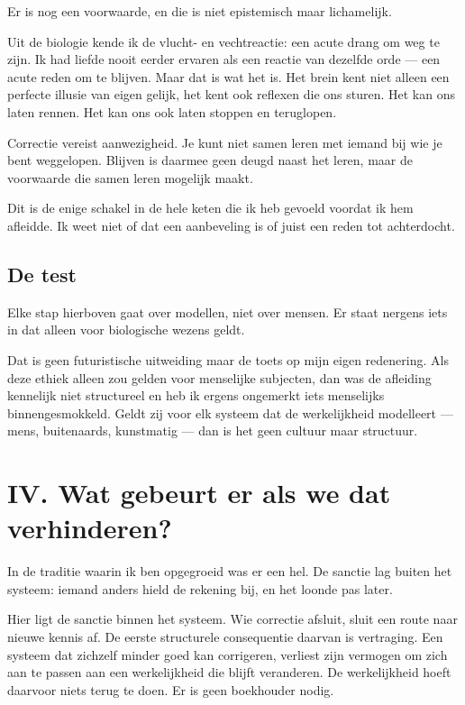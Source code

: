 \documentclass[11pt,a4paper]{article}
\begin{document}
Er is nog een voorwaarde, en die is niet epistemisch maar lichamelijk.

Uit de biologie kende ik de vlucht- en vechtreactie: een acute drang om weg te zijn. Ik had liefde nooit eerder ervaren als een reactie van dezelfde orde --- een acute reden om te blijven. Maar dat is wat het is. Het brein kent niet alleen een perfecte illusie van eigen gelijk, het kent ook reflexen die ons sturen. Het kan ons laten rennen. Het kan ons ook laten stoppen en teruglopen.

Correctie vereist aanwezigheid. Je kunt niet samen leren met iemand bij wie je bent weggelopen. Blijven is daarmee geen deugd naast het leren, maar de voorwaarde die samen leren mogelijk maakt.

Dit is de enige schakel in de hele keten die ik heb gevoeld voordat ik hem afleidde. Ik weet niet of dat een aanbeveling is of juist een reden tot achterdocht.

\subsection*{De test}

Elke stap hierboven gaat over modellen, niet over mensen. Er staat nergens iets in dat alleen voor biologische wezens geldt.

Dat is geen futuristische uitweiding maar de toets op mijn eigen redenering. Als deze ethiek alleen zou gelden voor menselijke subjecten, dan was de afleiding kennelijk niet structureel en heb ik ergens ongemerkt iets menselijks binnengesmokkeld. Geldt zij voor elk systeem dat de werkelijkheid modelleert --- mens, buitenaards, kunstmatig --- dan is het geen cultuur maar structuur.

\section*{IV. Wat gebeurt er als we dat verhinderen?}

In de traditie waarin ik ben opgegroeid was er een hel. De sanctie lag buiten het systeem: iemand anders hield de rekening bij, en het loonde pas later.

Hier ligt de sanctie binnen het systeem. Wie correctie afsluit, sluit een route naar nieuwe kennis af. De eerste structurele consequentie daarvan is vertraging. Een systeem dat zichzelf minder goed kan corrigeren, verliest zijn vermogen om zich aan te passen aan een werkelijkheid die blijft veranderen. De werkelijkheid hoeft daarvoor niets terug te doen. Er is geen boekhouder nodig.
\end{document}

